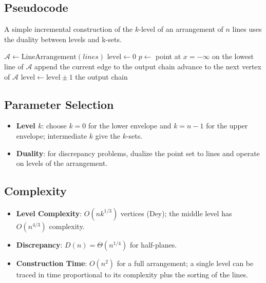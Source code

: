 \subsection{Pseudocode}

A simple incremental construction of the $k$-level of an arrangement of $n$
lines uses the duality between levels and k-sets.

\begin{algorithm}[ht]
\label{alg:compute_klevel}
\caption{Compute the k-Level of a Line Arrangement}
\begin{algorithmic}[1]
  \State $\mathcal{A} \gets \text{LineArrangement}(lines)$
  \State $\text{level} \gets 0$
  \State $p \gets$ point at $x = -\infty$ on the lowest line of $\mathcal{A}$
      \State append the current edge to the output chain
    \EndIf
    \State advance to the next vertex of $\mathcal{A}$
    \State $\text{level} \gets \text{level} \pm 1$ 
  \EndWhile
  \State \Return the output chain
\EndFunction
\end{algorithmic}
\end{algorithm}

\subsection{Parameter Selection}
\begin{itemize}
    \item \textbf{Level $k$}: choose $k = 0$ for the lower envelope and
      $k = n - 1$ for the upper envelope; intermediate $k$ give the $k$-sets.
    \item \textbf{Duality}: for discrepancy problems, dualize the point set to
      lines and operate on levels of the arrangement.
\end{itemize}

\subsection{Complexity}
\begin{itemize}
    \item \textbf{Level Complexity}: $O(n k^{1/3})$ vertices (Dey); the middle
      level has $O(n^{4/3})$ complexity.
    \item \textbf{Discrepancy}: $D(n) = \Theta(n^{1/4})$ for half-planes.
    \item \textbf{Construction Time}: $O(n^2)$ for a full arrangement; a single
      level can be traced in time proportional to its complexity plus the
      sorting of the lines.
\end{itemize}

